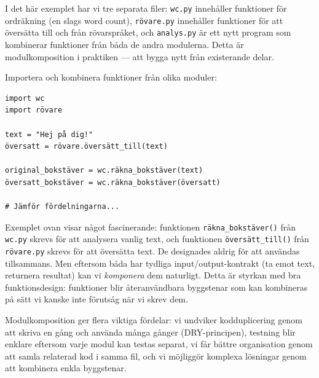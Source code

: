 I det här exemplet har vi tre separata filer: \texttt{wc.py} innehåller funktioner för ordräkning (en slags \foreignlanguage{english}{word count}), \texttt{rövare.py} innehåller funktioner för att översätta till och från rövarspråket, och \texttt{analys.py} är ett nytt program som kombinerar funktioner från båda de andra modulerna. Detta är modulkomposition i praktiken --- att bygga nytt från existerande delar.

\begin{frame}[fragile]
  \begin{example}
    Importera och kombinera funktioner från olika moduler:
    \begin{verbatim}
import wc
import rövare

text = "Hej på dig!"
översatt = rövare.översätt_till(text)

original_bokstäver = wc.räkna_bokstäver(text)
översatt_bokstäver = wc.räkna_bokstäver(översatt)

# Jämför fördelningarna...
    \end{verbatim}
  \end{example}
\end{frame}


Exemplet ovan visar något fascinerande: funktionen \texttt{räkna_bokstäver()} från \texttt{wc.py} skrevs för att analysera vanlig text, och funktionen \texttt{översätt_till()} från \texttt{rövare.py} skrevs för att översätta text. De designades aldrig för att användas tillsammans. Men eftersom båda har tydliga input/output-kontrakt (ta emot text, returnera resultat) kan vi \emph{komponera} dem naturligt. Detta är styrkan med bra funktionsdesign: funktioner blir återanvändbara byggstenar som kan kombineras på sätt vi kanske inte förutsåg när vi skrev dem.

\begin{frame}[fragile]
  \begin{remark}
    Modulkomposition ger flera viktiga fördelar: vi undviker kodduplicering genom
    att skriva en gång och använda många gånger (DRY-principen), testning blir
    enklare eftersom varje modul kan testas separat, vi får bättre organisation
    genom att samla relaterad kod i samma fil, och vi möjliggör komplexa lösningar
    genom att kombinera enkla byggstenar.
  \end{remark}
\end{frame}


